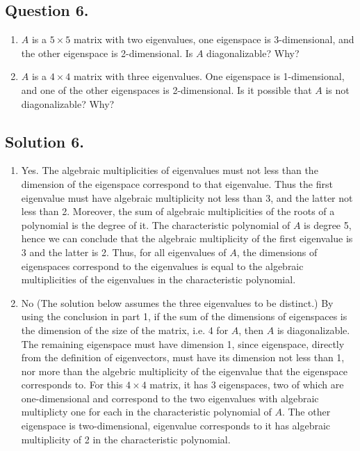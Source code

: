 \documentclass{article}
\begin{document}
\subsection*{Question 6.}
\begin{enumerate} [label=(\arabic*)]
    \item $A$ is a $5\times 5$ matrix with two eigenvalues, one eigenspace is 3-dimensional, and the other eigenspace is 2-dimensional. Is  $A$ diagonalizable? Why?
    \item $A$ is a $4\times 4$ matrix with three eigenvalues. One eigenspace is 1-dimensional, and one of the other eigenspaces is 2-dimensional. Is it possible that $A$ is not diagonalizable? Why?
\end{enumerate}
\subsection*{Solution 6.}
\begin{enumerate} [label=(\arabic*)]
    \item Yes. \newline
    The algebraic multiplicities of eigenvalues must not less than the dimension of the eigenspace correspond to that eigenvalue. Thus the first eigenvalue must have algebraic multiplicity not less than 3, and the latter not less than 2. \newline
    Moreover, the sum of algebraic multiplicities of the roots of a polynomial is the degree of it. The characteristic polynomial of $A$ is degree 5, hence we can conclude that the algebraic multiplicity of the first eigenvalue is 3 and the latter is 2. \newline
    Thus, for all eigenvalues of $A$, the dimensions of eigenspaces correspond to the eigenvalues is equal to the algebraic multiplicities of the eigenvalues in the characteristic polynomial.
    \item No\newline
    (The solution below assumes the three eigenvalues to be distinct.)\newline
    By using the conclusion in part 1, if the sum of the dimensions of eigenspaces is the dimension of the size of the matrix, i.e. 4 for $A$, then $A$ is diagonalizable.\newline
    The remaining eigenspace must have dimension 1,\newline
    since eigenspace, directly from the definition of eigenvectors, must have its dimension not less than 1,\newline
    nor more than the algebric multiplicity of the eigenvalue that the eigenspace corresponds to.\newline
    For this $4\times 4$ matrix, it has 3 eigenspaces, two of which are one-dimensional and correspond to the two eigenvalues with algebraic multiplicty one for each in the characteristic polynomial of $A$.\newline
    The other eigenspace is two-dimensional, eigenvalue corresponds to it has algebraic multiplicity of 2 in the characteristic polynomial.
\end{enumerate}
\end{document}
